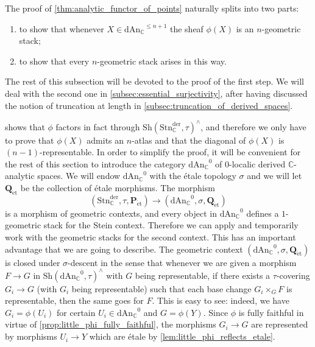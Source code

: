 \documentclass[12pt,a4paper,reqno]{amsart}
\theoremstyle{plain}
\theoremstyle{definition}
\theoremstyle{remark}
\numberwithin{equation}{section}
\begin{document}
The proof of \cref{thm:analytic_functor_of_points} naturally splits into two parts:
\begin{enumerate}
	\item to show that whenever $X \in {\mathrm{dAn}_{\mathbb C}}^{\le n+1}$ the sheaf $\phi(X)$ is an $n$-geometric stack;
	\item to show that every $n$-geometric stack arises in this way.
\end{enumerate}
The rest of this subsection will be devoted to the proof of the first step.
We will deal with the second one in \cref{subsec:essential_surjectivity}, after having discussed the notion of truncation at length in \cref{subsec:truncation_of_derived_spaces}.

 shows that $\phi$ factors in fact through ${\mathrm{Sh}}({\mathrm{Stn}^{\mathrm{der}}_{\mathbb C}}, \tau)^\wedge$, and therefore we only have to prove that $\phi(X)$ admits an $n$-atlas and that the diagonal of $\phi(X)$ is $(n-1)$-representable.
In order to simplify the proof, it will be convenient for the rest of this section to introduce the category ${\mathrm{dAn}_{\mathbb C}}^0$ of $0$-localic derived {$\mathbb C$-analytic\xspace} spaces.
We will endow ${\mathrm{dAn}_{\mathbb C}}^0$ with the \'etale topology $\sigma$ and we will let $\mathbf Q_{\mathrm{\acute{e}t}}$ be the collection of \'etale morphisms.
The morphism
\[ ({\mathrm{Stn}^{\mathrm{der}}_{\mathbb C}}, \tau, {\mathbf P}_{\mathrm{\acute{e}t}}) \to ({\mathrm{dAn}_{\mathbb C}}^0, \sigma, \mathbf Q_{\mathrm{\acute{e}t}}) \]
is a morphism of geometric contexts, and every object in ${\mathrm{dAn}_{\mathbb C}}^0$ defines a $1$-geometric stack for the Stein context.
Therefore we can apply \cite[Lemma 2.36]{Porta_Yu_Higher_analytic_stacks_2014} and temporarily work with the geometric stacks for the second context.
This has an important advantage that we are going to describe.
The geometric context $({\mathrm{dAn}_{\mathbb C}}^0, \sigma, \mathbf Q_{\mathrm{\acute{e}t}})$ is closed under $\sigma$-descent in the sense that whenever we are given a morphism $F \to G$ in ${\mathrm{Sh}}({\mathrm{dAn}_{\mathbb C}}^0, \tau)^\wedge$ with $G$ being representable, if there exists a $\tau$-covering $G_i \to G$ (with $G_i$ being representable) such that each base change $G_i \times_G F$ is representable, then the same goes for $F$.
This is easy to see: indeed, we have $G_i = \phi(U_i)$ for certain $U_i \in {\mathrm{dAn}_{\mathbb C}}^0$ and $G = \phi(Y)$. Since $\phi$ is fully faithful in virtue of \cref{prop:little_phi_fully_faithful}, the morphisms $G_i \to G$ are represented by morphisms $U_i \to Y$ which are \'etale by \cref{lem:little_phi_reflects_etale}.
\end{document}
